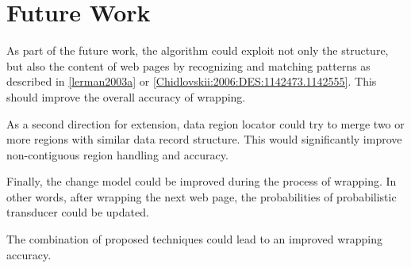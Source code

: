 \section{Future Work}
\label{sec:future-work}

As part of the future work, the algorithm could exploit not only the structure, but also the content of web pages by recognizing and matching patterns as described in \ref{lerman2003a} or \ref{Chidlovskii:2006:DES:1142473.1142555}. This should improve the overall accuracy of wrapping.

As a second direction for extension, data region locator could try to merge two or more regions with similar data record structure. This would significantly improve non-contiguous region handling and accuracy.

Finally, the change model could be improved during the process of wrapping. In other words, after wrapping the next web page, the probabilities of probabilistic transducer could be updated.

The combination of proposed techniques could lead to an improved wrapping accuracy.


